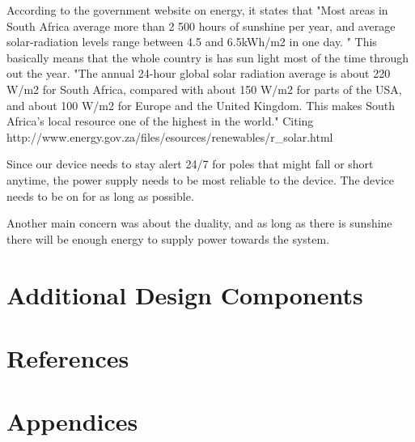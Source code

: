 \documentclass[12pt]{article}
\begin{document}
According to the government website on energy, it states that "Most areas in South Africa average more than 2 500 hours of sunshine per year, and average solar-radiation levels range between 4.5 and 6.5kWh/m2 in one day. " This basically means that the whole country is has sun light most of the time through out the year. "The annual 24-hour global solar radiation average is about 220 W/m2 for South Africa, compared with about 150 W/m2 for parts of the USA, and about 100 W/m2 for Europe and the United Kingdom. This makes South Africa's local resource one of the highest in the world." Citing http://www.energy.gov.za/files/esources/renewables/r_solar.html

Since our device needs to stay alert 24/7 for poles that might fall or short anytime, the power supply needs to be most reliable to the device. The device needs to be on for as long as possible. 

Another main concern was about the duality, and as long as there is sunshine there will be enough energy to supply power towards the system.  

\section{Additional Design Components}

\section{References}

\section{Appendices}
\end{document}
